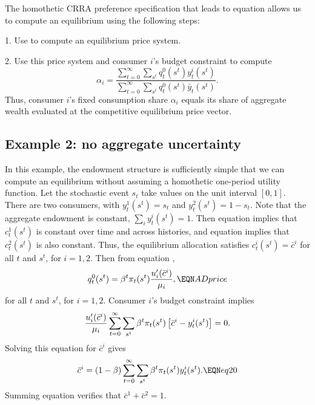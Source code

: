 The homothetic CRRA preference specification that leads to equation  allows us to compute an equilibrium
using the following steps:
\medskip
\item{1.} Use  to compute an equilibrium price system.

\medskip
\item{2.} Use this price system and consumer $i$'s budget constraint to compute
$$ \alpha_i = {\frac {\sum_{t=0}^\infty \sum_{s^t} q_t^0(s^t) y_t^i(s^t) } {\sum_{t=0}^\infty \sum_{s^t} q_t^0(s^t) \bar y_t(s^t)  } } .$$
Thus, consumer $i$'s fixed consumption share $\alpha_i$ equals its share of aggregate wealth evaluated at the competitive  equilibrium price vector.



\subsection{Example 2: no aggregate uncertainty}\label{sec:example2GG}%
In this example, the endowment structure is sufficiently simple that we can compute an equilibrium without assuming a homothetic
one-period utility function. Let the stochastic event $s_t$ take values on the unit interval
$[0,1]$.  There are two consumers, with $ y_t^1(s^t) =s_t$ and
$y_t^2(s^t) =1-s_t$.  Note that the aggregate endowment is
constant, $\sum_i y_t^i(s^t) =1$.  Then equation  implies
that $c_t^1(s^t)$ is constant over time and across histories, and
equation  implies that $c_t^2(s^t)$ is also constant.
Thus, the equilibrium allocation satisfies
$c_t^i(s^t) = \bar c^i$ for all $t$ and $s^t$, for $i=1,2$.  Then
from equation ,
$$ q_t^0(s^t) = \beta^t \pi_t(s^t) {u'_i(\bar c^i) \over \mu_i}, \EQN ADprice $$
for all $t$ and $s^t$, for $i=1,2$.  Consumer $i$'s budget constraint
implies
 $$ {u'_i(\bar c^i) \over \mu_i} \sum_{t=0}^\infty \sum_{s^t} \beta^t \pi_t(s^t)
\left[\bar c^i - y_t^i(s^t)\right] = 0 .$$ Solving this equation
for $\bar c^i$ gives
$$ \bar c^i =( 1 -\beta) \sum_{t=0}^\infty \sum_{s^t} \beta^t \pi_t(s^t) y_t^i(s^t) .
      \EQN eq20 $$
Summing equation   verifies that $\bar c^1 + \bar c^2
=1$.


